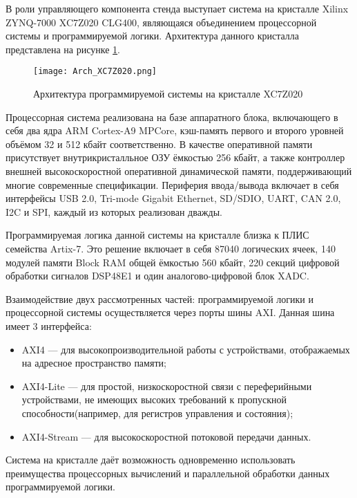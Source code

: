 В роли управляющего компонента стенда выступает система на кристалле Xilinx ZYNQ-7000 XC7Z020 CLG400, являющаяся объединением процессорной системы и программируемой логики. Архитектура данного кристалла представлена на рисунке \ref{fig:Arch_XC7Z020}.\par
\begin{figure}[ht]
    \centering
    \texttt{[image: Arch\_XC7Z020.png]}
    \caption{Архитектура программируемой системы на кристалле XC7Z020}
    \label{fig:Arch_XC7Z020}
\end{figure}
Процессорная система реализована на базе аппаратного блока, включающего в себя два ядра ARM Cortex-A9 MPCore, кэш-память первого и второго уровней объёмом 32 и 512 кбайт соответственно. В качестве оперативной памяти присутствует внутрикристалльное ОЗУ ёмкостью 256 кбайт, а также контроллер внешней высокоскоростной оперативной динамической памяти, поддерживающий многие современные спецификации. Периферия ввода/вывода включает в себя интерфейсы USB 2.0, Tri-mode Gigabit Ethernet, SD/SDIO, UART, CAN 2.0, I2C и SPI, каждый из которых реализован дважды.\par
Программируемая логика данной системы на кристалле близка к ПЛИС семейства Artix-7. Это решение включает в себя 87040 логических ячеек, 140 модулей памяти Block RAM общей ёмкостью 560 кбайт, 220 секций цифровой обработки сигналов DSP48E1 и один аналогово-цифровой блок XADC.\par
Взаимодействие двух рассмотренных частей: программируемой логики и процессорной системы осуществляется через порты шины AXI. Данная шина имеет 3 интерфейса:
\begin{itemize}
    \item AXI4 --- для высокопроизводительной работы с устройствами, отображаемых на адресное пространство памяти;
    \item AXI4-Lite --- для простой, низкоскоростной связи с переферийными устройствами, не имеющих высоких требований к пропускной способности(например, для регистров управления и состояния);
    \item AXI4-Stream --- для высокоскоростной потоковой передачи данных.
\end{itemize}\par
Система на кристалле даёт возможность одновременно использовать преимущества процессорных вычислений и параллельной обработки данных программируемой логики.

